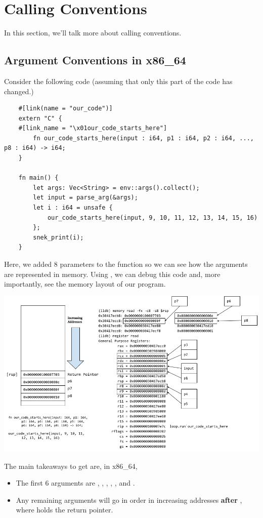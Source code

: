 \documentclass[letterpaper]{article}
\begin{document}
\section{Calling Conventions}
In this section, we'll talk more about calling conventions. 

\subsection{Argument Conventions in x86\_64}
Consider the following code (assuming that only this part of the code has changed.)
\begin{verbatim}
    #[link(name = "our_code")]
    extern "C" {
    #[link_name = "\x01our_code_starts_here"]
        fn our_code_starts_here(input : i64, p1 : i64, p2 : i64, ..., p8 : i64) -> i64;
    }

    fn main() {
        let args: Vec<String> = env::args().collect();
        let input = parse_arg(&args);
        let i : i64 = unsafe { 
            our_code_starts_here(input, 9, 10, 11, 12, 13, 14, 15, 16) 
        };
        snek_print(i);
    }\end{verbatim}
Here, we added 8 parameters to the  function so we can see how the arguments are represented in memory. Using , we can debug this code and, more importantly, see the memory layout of our program.
\begin{center}
    \includegraphics[scale=0.5]{../assets/mem_layout.png}
\end{center}
The main takeaways to get are, in x86\_64,
\begin{itemize}
    \item The first 6 arguments are , , , , , and .
    \item Any remaining arguments will go in order in increasing addresses \textbf{after} \code{[rsp]}, where \code{[rsp]} holds the return pointer.
\end{itemize}
\end{document}
